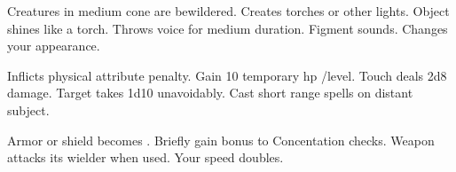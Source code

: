 \begin{swspelllist}
   Creatures in medium cone are bewildered.
   Creates torches or other lights.
   Object shines like a torch.
   Throws voice for medium duration.
   Figment sounds.
   Changes your appearance.

   Inflicts  physical attribute penalty.
   Gain 10 temporary hp /level.
   Touch deals 2d8 damage.
   Target takes 1d10 unavoidably.
   Cast short range spells on distant subject.

   Armor or shield becomes .
   Briefly gain bonus to Concentation checks.
   Weapon attacks its wielder when used.
   Your speed doubles.
\end{swspelllist}

